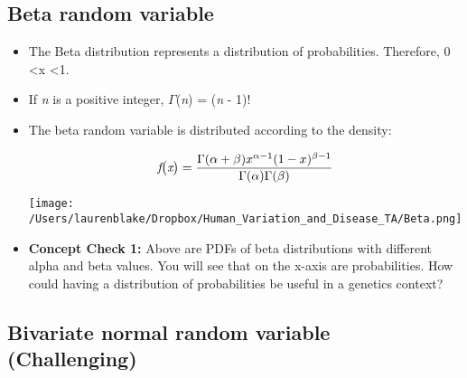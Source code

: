 \documentclass[12pt]{report}
\begin{document}
\bigskip

\bigskip

\bigskip

\subsection{Beta random variable} 

\begin{itemize}

\item The Beta distribution represents a distribution of probabilities. Therefore, 0 \textless  x \textless 1.

\item If \textit{n} is a positive integer, $\Gamma$\big(\textit{n}\big) = \big(\textit{n} - 1\big)!

\item The beta random variable is distributed according to the density:

 \begin{equation} 
\textit{f\big(x\big)} = \frac{\Gamma(\alpha + \beta)x^{\alpha-1}(1-x)^{\beta-1}}{\Gamma(\alpha)\Gamma(\beta) }
\end{equation}

\texttt{[image: /Users/laurenblake/Dropbox/Human\_Variation\_and\_Disease\_TA/Beta.png]}

\item  \textbf{Concept Check 1:} Above are PDFs of beta distributions with different alpha and beta values. You will see that on the x-axis are probabilities. How could having a distribution of probabilities be useful in a genetics context?

\bigskip

\bigskip

\bigskip

\end{itemize}

\subsection{Bivariate normal random variable (Challenging)}
\end{document}
